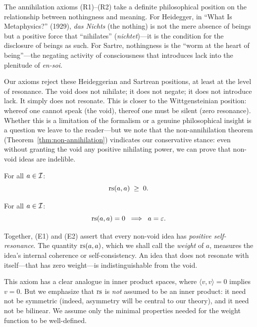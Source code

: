 \begin{remark}\label{rem:ch1:annihilation_nothingness}
The annihilation axioms (R1)--(R2) take a definite philosophical position
on the relationship between nothingness and meaning. For Heidegger, in
``What Is Metaphysics?'' (1929), \emph{das Nichts} (the nothing) is not
the mere absence of beings but a positive force that ``nihilates''
(\emph{nichtet})---it is the condition for the disclosure of beings as
such. For Sartre, nothingness is the ``worm at the heart of being''---the
negating activity of consciousness that introduces lack into the plenitude
of \emph{en-soi}.

Our axioms reject these Heideggerian and Sartrean positions, at least at
the level of resonance. The void does not nihilate; it does not negate;
it does not introduce lack. It simply does not resonate. This is closer
to the Wittgensteinian position: whereof one cannot speak (the void),
thereof one must be silent (zero resonance). Whether this is a limitation
of the formalism or a genuine philosophical insight is a question we
leave to the reader---but we note that the non-annihilation theorem
(Theorem~\ref{thm:non-annihilation}) vindicates our conservative stance:
even without granting the void any positive nihilating power, we can prove
that non-void ideas are indelible.
\end{remark}

\begin{axiom_def}
For all $a \in \mathcal{I}$:
\[
    \mathrm{rs}(a, a) \;\geq\; 0.
\]
\end{axiom_def}

\begin{axiom_def}
For all $a \in \mathcal{I}$:
\[
    \mathrm{rs}(a, a) = 0 \;\implies\; a = \varepsilon.
\]
\end{axiom_def}

\begin{interpretation}
Together, (E1) and (E2) assert that every non-void idea has \emph{positive
self-resonance}. The quantity $\mathrm{rs}(a,a)$, which we shall call the
\emph{weight} of $a$, measures the idea's internal coherence or
self-consistency. An idea that does not resonate with itself---that has
zero weight---is indistinguishable from the void.

This axiom has a clear analogue in inner product spaces, where
$\langle v, v \rangle = 0$ implies $v = 0$. But we emphasize that $\mathrm{rs}$
is \emph{not} assumed to be an inner product: it need not be symmetric
(indeed, asymmetry will be central to our theory), and it need not be
bilinear. We assume only the minimal properties needed for the weight
function to be well-defined.
\end{interpretation}


